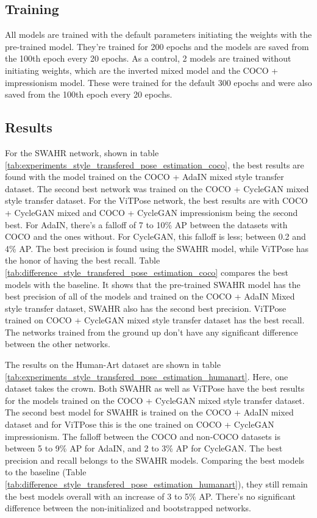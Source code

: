 \subsection{Training}
\label{sec:improvements_training_pose_estimation}
All models are trained with the default parameters initiating the weights with the pre-trained model.
They're trained for 200 epochs and the models are saved from the 100th epoch every 20 epochs.
As a control, 2 models are trained without initiating weights, which are the inverted mixed model and the COCO + impressionism model.
These were trained for the default 300 epochs and were also saved from the 100th epoch every 20 epochs.

\subsection{Results}
\label{sec:improvements_results_pose_estimation}
For the SWAHR network, shown in table \ref{tab:experiments_style_transfered_pose_estimation_coco}, the best results are found with the model trained on the COCO + AdaIN mixed style transfer dataset.
The second best network was trained on the COCO + CycleGAN mixed style transfer dataset.
For the ViTPose network, the best results are with COCO + CycleGAN mixed and COCO + CycleGAN impressionism being the second best.
For AdaIN, there's a falloff of 7 to 10\% AP between the datasets with COCO and the ones without.
For CycleGAN, this falloff is less; between 0.2 and 4\% AP.
The best precision is found using the SWAHR model, while ViTPose has the honor of having the best recall.
Table \ref{tab:difference_style_transfered_pose_estimation_coco} compares the best models with the baseline.
It shows that the pre-trained SWAHR model has the best precision of all of the models and trained on the COCO + AdaIN Mixed style transfer dataset, SWAHR also has the second best precision.
ViTPose trained on COCO + CycleGAN mixed style transfer dataset has the best recall.
The networks trained from the ground up don't have any significant difference between the other networks.

The results on the Human-Art dataset are shown in table \ref{tab:experiments_style_transfered_pose_estimation_humanart}.
Here, one dataset takes the crown.
Both SWAHR as well as ViTPose have the best results for the models trained on the COCO + CycleGAN mixed style transfer dataset.
The second best model for SWAHR is trained on the COCO + AdaIN mixed dataset and for ViTPose this is the one trained on COCO + CycleGAN impressionism.
The falloff between the COCO and non-COCO datasets is between 5 to 9\% AP for AdaIN, and 2 to 3\% AP for CycleGAN.
The best precision and recall belongs to the SWAHR models.
Comparing the best models to the baseline (Table \ref{tab:difference_style_transfered_pose_estimation_humanart}), they still remain the best models overall with an increase of 3 to 5\% AP.
There's no significant difference between the non-initialized and bootstrapped networks.

